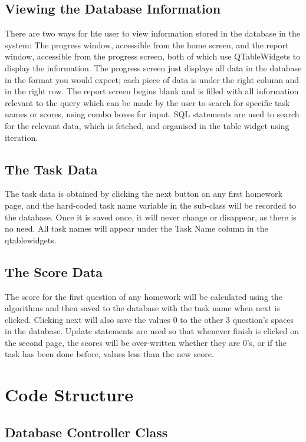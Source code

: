 \subsection{Viewing the Database Information}

There are two ways for hte user to view information stored in the database in the system: The progress window, accessible from the home screen, and the report window, accessible from the progress screen, both of which use QTableWidgets to display the information. The progress screen just displays all data in the database in the format you would expect; each piece of data is under the right column and in the right row. The report screen begins blank and is filled with all information relevant to the query which can be made by the user to search for specific task names or scores, using combo boxes for input. SQL statements are used to search for the relevant data, which is fetched, and organised in the table widget using iteration.

\subsection{The Task Data}

The task data is obtained by clicking the next button on any first homework page, and the hard-coded task name variable in the sub-class will be recorded to the database. Once it is saved once, it will never change or disappear, as there is no need. All task names will appear under the Task Name column in the qtablewidgets.

\subsection{The Score Data}

The score for the first question of any homework will be calculated using the algorithms and then saved to the database with the task name when next is clicked. Clicking next will also save the values 0 to the other 3 question's spaces in the database. Update statements are used so that whenever finish is clicked on the second page, the scores will be over-written whether they are 0's, or if the task has been done before, values less than the new score.

\section{Code Structure}

\subsection{Database Controller Class}

